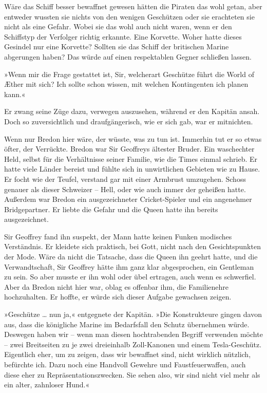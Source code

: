 Wäre das Schiff besser bewaffnet gewesen hätten die Piraten das
wohl getan, aber entweder wussten sie nichts von den wenigen
Geschützen oder sie erachteten sie nicht als eine Gefahr. Wobei sie
das wohl auch nicht waren, wenn er den Schiffstyp der Verfolger
richtig erkannte. Eine Korvette. Woher hatte dieses Gesindel nur
eine Korvette? Sollten sie das Schiff der britischen Marine
abgerungen haben? Das würde auf einen respektablen Gegner schließen
lassen.

»Wenn mir die Frage gestattet ist, Sir, welcherart Geschütze führt
die World of Æther mit sich? Ich sollte schon wissen, mit welchen
Kontingenten ich planen kann.«

Er zwang seine Züge dazu, verwegen auszusehen, während er den
Kapitän ansah. Doch so zuversichtlich und draufgängerisch, wie er
sich gab, war er mitnichten.

\bigpar

Wenn nur Bredon hier wäre, der wüsste, was zu tun ist. Immerhin tut
er so etwas öfter, der Verrückte. Bredon war Sir Geoffreys ältester
Bruder. Ein waschechter Held, selbst für die Verhältnisse seiner
Familie, wie die Times einmal schrieb. Er hatte viele Länder
bereist und fühlte sich in unwirtlichen Gebieten wie zu Hause. Er
focht wie der Teufel, verstand gar mit einer Armbrust umzugehen.
Schoss genauer als dieser Schweizer – Hell, oder wie auch immer der
geheißen hatte. Außerdem war Bredon ein ausgezeichneter
Cricket-Spieler und ein angenehmer Bridgepartner. Er liebte die
Gefahr und die Queen hatte ihn bereits ausgezeichnet.

Sir Geoffrey fand ihn suspekt, der Mann hatte keinen Funken
modisches Verständnis. Er kleidete sich praktisch, bei Gott, nicht
nach den Gesichtspunkten der Mode. Wäre da nicht die Tatsache, dass
die Queen ihn geehrt hatte, und die Verwandtschaft, Sir Geoffrey
hätte ihm ganz klar abgesprochen, ein Gentleman zu sein. So aber
musste er ihn wohl oder übel ertragen, auch wenn es schwerfiel.
Aber da Bredon nicht hier war, oblag es offenbar ihm, die
Familienehre hochzuhalten. Er hoffte, er würde sich dieser Aufgabe
gewachsen zeigen.

»Geschütze \ldots{} nun ja,« entgegnete der Kapitän. »Die Konstrukteure
gingen davon aus, dass die königliche Marine im Bedarfsfall den
Schutz übernehmen würde. Deswegen haben wir – wenn man diesen
hochtrabenden Begriff verwenden möchte – zwei Breitseiten zu je
zwei dreieinhalb Zoll-Kanonen und einem Tesla-Geschütz. Eigentlich
eher, um zu zeigen, dass wir bewaffnet sind, nicht wirklich
nützlich, befürchte ich. Dazu noch eine Handvoll Gewehre und
Faustfeuerwaffen, auch diese eher zu Repräsentationszwecken. Sie
sehen also, wir sind nicht viel mehr als ein alter, zahnloser
Hund.«


